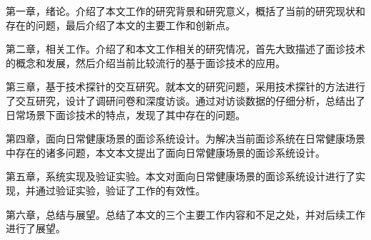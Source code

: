 第一章，绪论。介绍了本文工作的研究背景和研究意义，概括了当前的研究现状和存在的问题，最后介绍了本文的主要工作和创新点。

第二章，相关工作。介绍了和本文工作相关的研究情况，首先大致描述了面诊技术的概念和发展，然后介绍当前比较流行的基于面诊技术的应用。

第三章，基于技术探针的交互研究。就本文的研究问题，采用技术探针的方法进行了交互研究，设计了调研问卷和深度访谈。通过对访谈数据的仔细分析，总结出了日常场景下面诊技术的特点，发现了其中存在的问题。

第四章，面向日常健康场景的面诊系统设计。为解决当前面诊系统在日常健康场景中存在的诸多问题，本文本文提出了面向日常健康场景的面诊系统设计。

第五章，系统实现及验证实验。本文对面向日常健康场景的面诊系统设计进行了实现，并通过验证实验，验证了工作的有效性。

第六章，总结与展望。总结了本文的三个主要工作内容和不足之处，并对后续工作进行了展望。